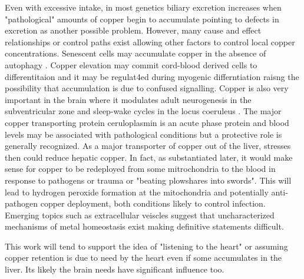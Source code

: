 {Even with excessive intake, in most genetics
 biliary excretion increases when "pathological"
amounts of copper begin to accumulate
\cite{Chen_Min_Wang_Copper_homeostasis_cuproptosis_2022}
\cite{Hamza_Gitlin_Hepatic_Copper_Transport_2013} pointing
to defects in excretion as another possible problem.
However, many cause and effect relationships or
control paths exist allowing other factors to control
local copper concentrations.  
Senescent cells may accumulate copper in the absence
of autophagy
\cite{Masaldan_Clatworthy_Gamell_Copper_accumulation_senescent_2018}.
Copper elevation may commit 
cord-blood derived cells  to differentitaion \cite{PMID11849228}
and it may be regulat4ed during myogenic differntiation
\cite{PMC5824686} raisng the possibility that accumulation
is due to confused signalling. 
Copper is also very important in the brain
\cite{Gale_Aizenman_physiological_pathophysiological_2024}
 where
it modulates adult neurogenesis in the subventricular zone
\cite{PMC9456150}
and sleep-wake cycles in the locus coeruleus \cite{PMC6008210}.
The major copper transporting protein ceruloplasmin is an 
acute phase protein 
and blood levels may be associated with pathological conditions
\cite{PMID15668644} but a protective role is generally recognized.
As a major transporter of copper out of the liver, 
stresses then could reduce hepatic  copper.
In fact, as substantiated later, it would make sense
for copper to be redeployed from some mitrochondria to the blood
in response to pathogens or trauma or "beating plowshares into swords". 
This will lead to hydrogen
peroxide formation at the mitochondria  and potentially 
anti-pathogen copper deployment,   both conditions
likely to control infection. 
Emerging topics  such as extracellular veiscles 
\cite{Bellingham_Guo_Hill_secret_life_2015} suggest
that uncharacterized mechanisms of metal homeostasis
exist making definitive statements difficult.

This work will tend to support the idea of "listening to the heart"
or assuming copper retention is due to need by the heart 
even if some accumulates in the liver. Its likely the brain needs
have significant influence too. 





} %



